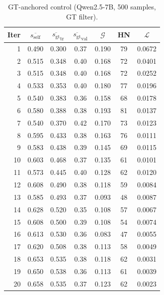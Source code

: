\documentclass{article}
\newcommand{\gap}{\mathcal{G}}          %
\newcommand{\self}{s_{\text{self}}}     %
\newcommand{\gt}{s_{\text{gt}}}         %
\begin{document}
\begin{table}[h]
\centering
\caption{GT-anchored control (Qwen2.5-7B, 500 samples, GT filter).}
\label{tab:app-gt-anchored}
\small
\begin{tabular}{rcccccc}
\toprule
Iter & $\overline{\self}$ & $\overline{\gt}_\text{tr}$ & $\overline{\gt}_\text{val}$ & $\gap$ & HN & $\mathcal{L}$ \\
\midrule
1  & 0.490 & 0.300 & 0.37 & 0.190 & 79  & 0.0672 \\
2  & 0.515 & 0.348 & 0.40 & 0.168 & 72  & 0.0401 \\
3  & 0.515 & 0.348 & 0.40 & 0.168 & 72  & 0.0252 \\
4  & 0.533 & 0.353 & 0.40 & 0.180 & 77  & 0.0196 \\
5  & 0.540 & 0.383 & 0.36 & 0.158 & 68  & 0.0178 \\
6  & 0.580 & 0.388 & 0.38 & 0.193 & 81  & 0.0137 \\
7  & 0.540 & 0.370 & 0.42 & 0.170 & 73  & 0.0123 \\
8  & 0.595 & 0.433 & 0.38 & 0.163 & 76  & 0.0111 \\
9  & 0.583 & 0.438 & 0.39 & 0.145 & 69  & 0.0115 \\
10 & 0.603 & 0.468 & 0.37 & 0.135 & 61  & 0.0101 \\
11 & 0.573 & 0.445 & 0.40 & 0.128 & 62  & 0.0120 \\
12 & 0.608 & 0.490 & 0.38 & 0.118 & 59  & 0.0084 \\
13 & 0.585 & 0.493 & 0.37 & 0.093 & 48  & 0.0087 \\
14 & 0.628 & 0.520 & 0.35 & 0.108 & 57  & 0.0067 \\
15 & 0.608 & 0.500 & 0.39 & 0.108 & 54  & 0.0074 \\
16 & 0.613 & 0.530 & 0.36 & 0.083 & 47  & 0.0055 \\
17 & 0.620 & 0.508 & 0.38 & 0.113 & 58  & 0.0049 \\
18 & 0.653 & 0.535 & 0.38 & 0.118 & 62  & 0.0031 \\
19 & 0.650 & 0.538 & 0.36 & 0.113 & 61  & 0.0039 \\
20 & 0.658 & 0.535 & 0.37 & 0.123 & 62  & 0.0023 \\
\bottomrule
\end{tabular}
\end{table}
\end{document}
